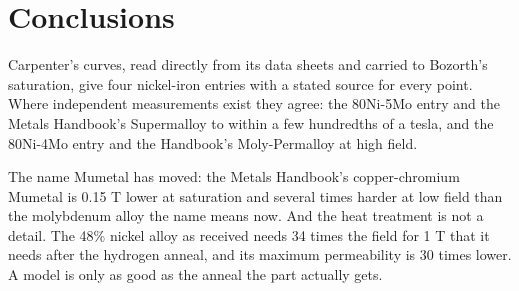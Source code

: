 \documentclass[
  11pt,
]{article}
\begin{document}
\section{Conclusions}\label{conclusions}

Carpenter's curves, read directly from its data sheets and carried to Bozorth's saturation, give four nickel-iron entries with a stated source for every point. Where independent measurements exist they agree: the 80Ni-5Mo entry and the Metals Handbook's Supermalloy to within a few hundredths of a tesla, and the 80Ni-4Mo entry and the Handbook's Moly-Permalloy at high field.

The name Mumetal has moved: the Metals Handbook's copper-chromium Mumetal is 0.15 T lower at saturation and several times harder at low field than the molybdenum alloy the name means now. And the heat treatment is not a detail. The 48\% nickel alloy as received needs 34 times the field for 1 T that it needs after the hydrogen anneal, and its maximum permeability is 30 times lower. A model is only as good as the anneal the part actually gets.
\end{document}
